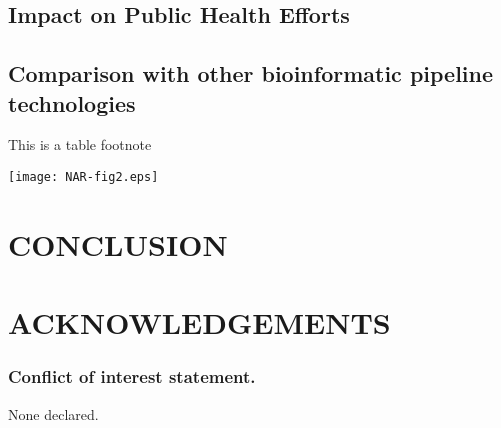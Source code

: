 \documentclass[a4,center,fleqn]{NAR}
\begin{document}
\subsection{Impact on Public Health Efforts}


\subsection{Comparison with other bioinformatic pipeline technologies}


\begin{table}[b]
{This is a table footnote}
\end{table}

\begin{figure*}[t]
\begin{center}
\texttt{[image: NAR-fig2.eps]}
\end{center}
\caption{Caption for wide figure over two columns.
\textbf{(a)} Left figure.
\textbf{(b)} Right figure (see (a)).
}
\label{NAR-fig2}
\end{figure*}

\section{CONCLUSION}

\section{ACKNOWLEDGEMENTS}


\subsubsection{Conflict of interest statement.} None declared.
\newpage
\end{document}
